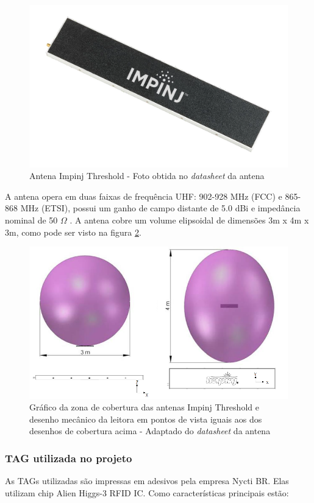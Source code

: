  \begin{figure}[H]
    \centering
    \includegraphics[width=0.6\linewidth]{figs/Metodologia/impinj_Threshold.png}
    \caption{Antena Impinj Threshold - Foto obtida no \textit{datasheet} da antena \cite{AntenaThresholdDatasheet}}
    \label{fig:AntenaThreshold_first}
\end{figure}
 
 A antena opera em duas faixas de frequência UHF: 902-928 MHz (FCC) e 865-868 MHz (ETSI), possui um ganho de campo distante de 5.0 dBi e impedância nominal de 50 $\Omega$ \cite{AntenaThresholdDatasheet}. A antena cobre um volume elipsoidal de dimensões 3m x 4m x 3m, como pode ser visto na figura \ref{fig:AntenaThresholdCobertura}.
 
  \begin{figure}[H]
    \centering
    \includegraphics[width=0.6\linewidth]{figs/Metodologia/impinj_antenna_coverage.png}
    \caption{Gráfico da zona de cobertura das antenas Impinj Threshold e desenho mecânico da leitora em pontos de vista iguais aos dos desenhos de cobertura acima - Adaptado do \textit{datasheet} da antena \cite{AntenaThresholdDatasheet}}
    \label{fig:AntenaThresholdCobertura}
\end{figure}

\subsubsection{TAG utilizada no projeto}

As TAGs utilizadas são impressas em adesivos pela empresa Nycti BR. Elas utilizam chip Alien Higgs-3 RFID IC. Como características principais estão:


